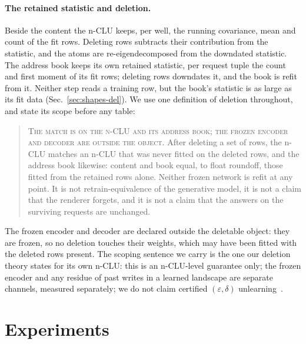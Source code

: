 \documentclass{article} %
\begin{document}
\paragraph{The retained statistic and deletion.} Beside the content the n-CLU keeps, per
well, the running covariance, mean and count of the fit rows. Deleting rows subtracts their
contribution from the statistic, and the atoms are re-eigendecomposed from the downdated
statistic. The address book keeps its own retained statistic, per request tuple the count and first
moment of its fit rows; deleting rows downdates it, and the book is refit from it. Neither step
reads a training row, but the book's statistic is as large as its fit data
(Sec.~\ref{sec:shapes-del}). We use one definition of deletion throughout, and state its scope
before any table:

\begin{quote}\small
\textsc{The match is on the n-CLU and its address book; the frozen encoder and decoder are outside
the object.} After deleting a set of rows, the n-CLU matches an n-CLU that was never fitted on the
deleted rows, and the address book likewise: content and book equal, to float roundoff, those fitted
from the retained rows alone. Neither frozen network is refit at any point. It is
not retrain-equivalence of the generative model, it is not a claim that the renderer forgets, and it
is not a claim that the answers on the surviving requests are unchanged.
\end{quote}

\noindent The frozen encoder and decoder are declared outside the deletable object: they are
frozen, so no deletion touches their weights, which may have been fitted with the deleted rows
present.
The scoping sentence we carry is the one our deletion theory states for its own n-CLU: this is
an n-CLU-level guarantee only; the frozen encoder and any residue of past writes in a learned
landscape are separate channels, measured separately; we do not claim certified
$(\varepsilon,\delta)$ unlearning~\citep{guo_certified_2023}. %

\section{Experiments}
\label{sec:experiments}
\end{document}
